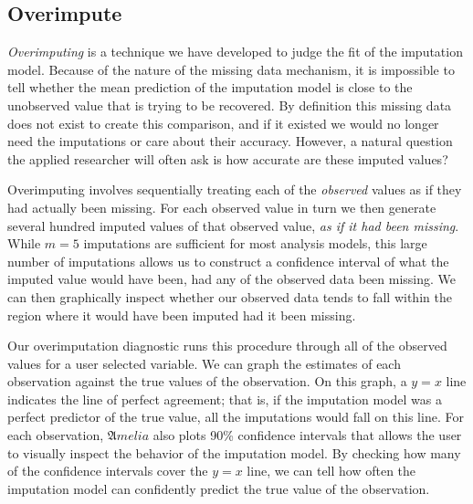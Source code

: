 \documentclass[12pt,titlepage]{article}
\newcommand{\Amelia}{\ensuremath{\mathfrak Amelia} }
\begin{document}
\subsection{Overimpute}
\label{sec:overimpute}

\emph{Overimputing} is a technique we have developed to judge the fit
of the imputation model.  Because of the nature of the missing data
mechanism, it is impossible to tell whether the mean prediction of the
imputation model is close to the unobserved value that is trying to be
recovered.  By definition this missing data does not exist to create
this comparison, and if it existed we would no longer need the
imputations or care about their accuracy.  However, a natural question
the applied researcher will often ask is how accurate are these
imputed values?

Overimputing involves sequentially treating each of the
\emph{observed} values as if they had actually been missing.  For each
observed value in turn we then generate several hundred imputed values
of that observed value, \emph{as if it had been missing}.  While $m=5$
imputations are sufficient for most analysis models, this large number
of imputations allows us to construct a confidence interval of what
the imputed value would have been, had any of the observed data been
missing.  We can then graphically inspect whether our observed data
tends to fall within the region where it would have been imputed had
it been missing.

Our overimputation diagnostic runs this procedure through all of the
observed values for a user selected variable.  We can graph the
estimates of each observation against the true values of the
observation.  On this graph, a $y=x$ line indicates the line of
perfect agreement; that is, if the imputation model was a perfect
predictor of the true value, all the imputations would fall on this
line.  For each observation, \Amelia also plots 90\% confidence
intervals that allows the user to visually inspect the behavior of the
imputation model. By checking how many of the confidence intervals
cover the $y=x$ line, we can tell how often the imputation model can
confidently predict the true value of the observation.
\end{document}
